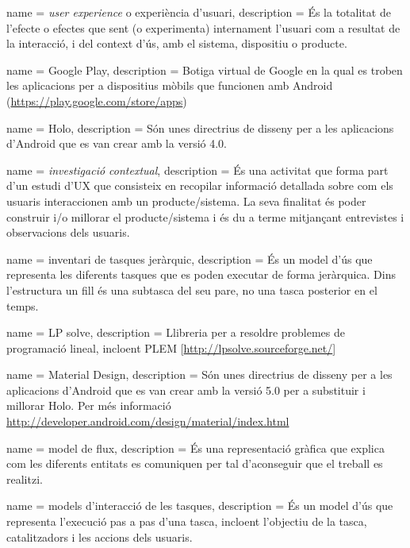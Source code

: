 {
name = \textit{user experience} o experiència d'usuari, description = {És la totalitat de l'efecte o efectes que sent (o experimenta) internament l'usuari com a resultat de la interacció, i del context d'ús, amb el sistema, dispositiu o producte.}
}

{
name = Google Play, description = {Botiga virtual de Google en la qual es troben les aplicacions per a dispositius mòbils que funcionen amb \gls{Android} (\url{https://play.google.com/store/apps})}
}

{
name = Holo, description = {Són unes directrius de disseny per a les aplicacions d'\gls{Android} que es van crear amb la versió 4.0.}
}

{
name = \textit{investigació contextual}, description = {És una activitat que forma part d'un estudi d'UX que consisteix en recopilar informació detallada sobre com els usuaris interaccionen amb un producte/sistema. La seva finalitat és poder construir i/o millorar el producte/sistema i és du a terme mitjançant entrevistes i observacions dels usuaris.}
}

{
name = inventari de tasques jeràrquic, description = {És un model d'ús que representa les diferents tasques que es poden executar de forma jeràrquica. Dins l'estructura un fill és una subtasca del seu pare, no una tasca posterior en el temps.}
}

{
name = LP solve, description = {Llibreria per a resoldre problemes de programació lineal, incloent PLEM [\url{http://lpsolve.sourceforge.net/}]}
}

{
name = Material Design, description = {Són unes directrius de disseny per a les aplicacions d'Android que es van crear amb la versió 5.0 per a substituir i millorar Holo. Per més informació \url{http://developer.android.com/design/material/index.html}}
}

{
name = model de flux, description = {És una representació gràfica que explica com les diferents entitats es comuniquen per tal d'aconseguir que el treball es realitzi.}
}

{
name = models d'interacció de les tasques, description = {És un model d'ús que representa l'execució pas a pas d'una tasca, incloent l'objectiu de la tasca, catalitzadors i les accions dels usuaris.}
}


